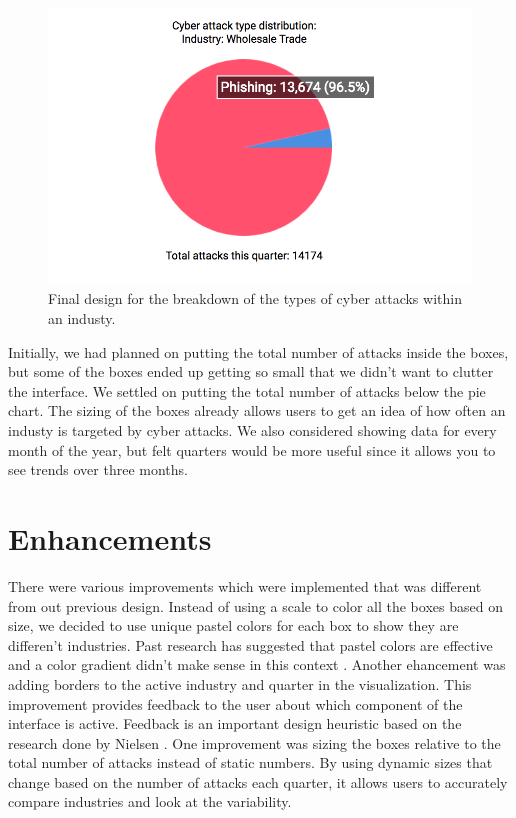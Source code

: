 \documentclass[journal]{vgtc}                %
\begin{document}
\begin{figure}[tb]
  \centering %
  \includegraphics[width=\columnwidth]{final_design2}
  \caption{Final design for the breakdown of the types of cyber attacks within an industy.}
  \label{fig:sample}
\end{figure}

Initially, we had planned on putting the total number of attacks inside the boxes, but some of the boxes ended up getting so small that we didn't want to clutter the interface. 
We settled on putting the total number of attacks below the pie chart.
The sizing of the boxes already allows users to get an idea of how often an industy is targeted by cyber attacks. 
We also considered showing data for every month of the year, but felt quarters would be more useful since it allows you to see trends over three months. 


\section{Enhancements}
There were various improvements which were implemented that was different from out previous design. 
Instead of using a scale to color all the boxes based on size, we decided to use unique pastel colors for each box to show they are differen't industries. 
Past research has suggested that pastel colors are effective and a color gradient didn't make sense in this context \cite{S6}.
Another ehancement was adding borders to the active industry and quarter in the visualization. 
This improvement provides feedback to the user about which component of the interface is active. 
Feedback is an important design heuristic based on the research done by Nielsen \cite{S9}.
One improvement was sizing the boxes relative to the total number of attacks instead of static numbers. 
By using dynamic sizes that change based on the number of attacks each quarter,  it allows users to accurately compare industries and look at the variability.  
\end{document}
